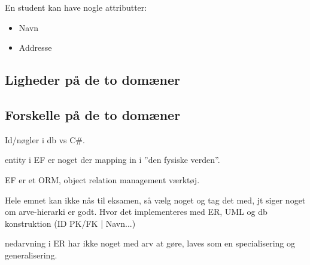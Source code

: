 En student kan have nogle attributter:

\begin{itemize}
	\item Navn 
	\item Addresse
\end{itemize}



\subsection{Ligheder på de to domæner}


\subsection{Forskelle på de to domæner}
Id/nøgler i db vs C\#. 


entity i EF er noget der mapping in i ''den fysiske verden''.

EF er et ORM, object relation management værktøj.

Hele emnet kan ikke nås til eksamen, så vælg noget og tag det med, jt siger noget om arve-hierarki er godt. Hvor det implementeres med ER, UML og db konstruktion (ID PK/FK | Navn...)

nedarvning i ER har ikke noget med arv at gøre, laves som en specialisering og generalisering.
